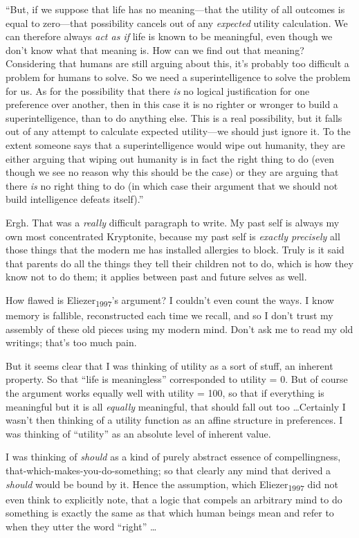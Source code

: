 {
 ``But, if we suppose that life has no
meaning---that the utility of all outcomes is equal to zero---that
possibility cancels out of any \textit{expected} utility calculation.
We can therefore always \textit{act as if} life is known to be
meaningful, even though we don't know what that meaning
is. How can we find out that meaning? Considering that humans are still
arguing about this, it's probably too difficult a
problem for humans to solve. So we need a superintelligence to solve
the problem for us. As for the possibility that there \textit{is} no
logical justification for one preference over another, then in this
case it is no righter or wronger to build a superintelligence, than to
do anything else. This is a real possibility, but it falls out of any
attempt to calculate expected utility---we should just ignore it. To
the extent someone says that a superintelligence would wipe out
humanity, they are either arguing that wiping out humanity is in fact
the right thing to do (even though we see no reason why this should be
the case) or they are arguing that there \textit{is} no right thing to
do (in which case their argument that we should not build intelligence
defeats itself).''}

{
 Ergh. That was a \textit{really} difficult paragraph to write. My
past self is always my own most concentrated Kryptonite, because my
past self is \textit{exactly precisely} all those things that the
modern me has installed allergies to block. Truly is it said that
parents do all the things they tell their children not to do, which is
how they know not to do them; it applies between past and future selves
as well.}

{
 How flawed is Eliezer\textsubscript{1997}'s
argument? I couldn't even count the ways. I know memory
is fallible, reconstructed each time we recall, and so I
don't trust my assembly of these old pieces using my
modern mind. Don't ask me to read my old writings;
that's too much pain.}

{
 But it seems clear that I was thinking of utility as a sort of
stuff, an inherent property. So that ``life is
meaningless'' corresponded to utility = 0. But of
course the argument works equally well with utility = 100, so that if
everything is meaningful but it is all \textit{equally} meaningful,
that should fall out too \ldots Certainly I wasn't then
thinking of a utility function as an affine structure in preferences. I
was thinking of ``utility'' as an
absolute level of inherent value.}

{
 I was thinking of \textit{should} as a kind of purely abstract
essence of compellingness, that-which-makes-you-do-something; so that
clearly any mind that derived a \textit{should} would be bound by it.
Hence the assumption, which Eliezer\textsubscript{1997} did not even
think to explicitly note, that a logic that compels an arbitrary mind
to do something is exactly the same as that which human beings mean and
refer to when they utter the word
``right'' \ldots}

